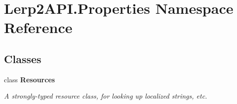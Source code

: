 \hypertarget{namespace_lerp2_a_p_i_1_1_properties}{}\section{Lerp2\+A\+P\+I.\+Properties Namespace Reference}
\label{namespace_lerp2_a_p_i_1_1_properties}
\subsection*{Classes}
\begin{DoxyCompactItemize}
\item 
class {\bfseries Resources}
\begin{DoxyCompactList}\small\item\em A strongly-\/typed resource class, for looking up localized strings, etc. \end{DoxyCompactList}\end{DoxyCompactItemize}
